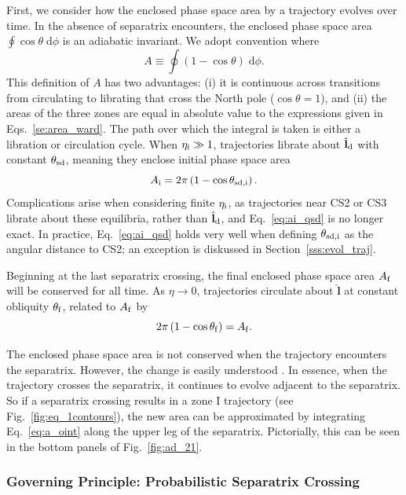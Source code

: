 \documentclass[twocolumn,twocolappendix]{aastex63}
\newcommand*{\bsmb}[1]{\boldsymbol{\mathbf{#1}}}
\newcommand*{\uv}[1]{\hat{\bsmb{#1}}}
\newcommand*{\p}[1]{\left(#1\right)}
\begin{document}
First, we consider how the enclosed phase space area by a trajectory evolves
over time. In the absence of separatrix encounters, the enclosed phase space
area $\oint \cos\theta \;\mathrm{d}\phi$ is an adiabatic invariant. We adopt
convention where
\begin{equation}
    A \equiv \oint \p{1 - \cos \theta}\;\mathrm{d}\phi.\label{eq:a_oint}
\end{equation}
This definition of $A$ has two advantages: (i) it is continuous across
transitions from circulating to librating that cross the North pole ($\cos
\theta = 1$), and (ii) the areas of the three zones are equal in absolute value
to the expressions given in Eqs.~\eqref{se:area_ward}. The path over which the
integral is taken is either a libration or circulation cycle. When $\eta_{\rm i}
\gg 1$, trajectories librate about $\uv{l}_{\rm d}$ with constant $\theta_{\rm
sd}$, meaning they enclose initial phase space area
\begin{equation}
    A_{\rm i} = 2\pi\p{1 - \cos \theta_{\rm sd, i}}.\label{eq:ai_qsd}
\end{equation}
Complications arise when considering finite $\eta_{\rm i}$, as trajectories near
CS2 or CS3 librate about these equilibria, rather than $\uv{l}_{\rm d}$, and
Eq.~\eqref{eq:ai_qsd} is no longer exact. In practice, Eq.~\eqref{eq:ai_qsd}
holds very well when defining $\theta_{\rm sd, i}$ as the angular distance to
CS2; an exception is diskussed in Section~\ref{sss:evol_traj}.

Beginning at the last separatrix crossing, the final enclosed phase space area
$A_{\rm f}$ will be conserved for all time. As $\eta \to 0$, trajectories
circulate about $\uv{l}$ at constant obliquity $\theta_{\rm f}$, related to
$A_{\rm f}$ by
\begin{equation}
    2\pi\p{1 - \cos \theta_{\rm f}} = A_{\rm f}. \label{eq:qfaf}
\end{equation}

The enclosed phase space area is not conserved when the trajectory encounters
the separatrix. However, the change is easily understood \citep{henrard1982}. In
essence, when the trajectory crosses the separatrix, it continues to evolve
adjacent to the separatrix. So if a separatrix crossing results in a zone I
trajectory (see Fig.~\ref{fig:eq_1contours}), the new area can be approximated
by integrating Eq.~\eqref{eq:a_oint} along the upper leg of the separatrix.
Pictorially, this can be seen in the bottom panels of Fig.~\ref{fig:ad_21}.

\subsubsection{Governing Principle: Probabilistic Separatrix Crossing}
\end{document}
